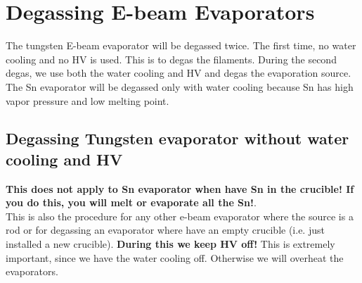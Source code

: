 \section{Degassing E-beam Evaporators}
The tungsten E-beam evaporator will be degassed twice. The first time, no water cooling and no HV is used. This is to degas the filaments. During the second degas, we use both the water cooling and HV and degas the evaporation source. The Sn evaporator will be degassed only with water cooling because Sn has high vapor pressure and low melting point.
\subsection{Degassing Tungsten evaporator without water cooling and HV}
\textbf{This does not apply to Sn evaporator when have Sn in the crucible! If you do this, you will melt or evaporate all the Sn!}.\\
This is also the procedure for any other e-beam evaporator where the source is a rod or for degassing an evaporator where have an empty crucible (i.e. just installed a new crucible). \textbf{During this we keep HV off!} This is extremely important, since we have the water cooling off. Otherwise we will overheat the evaporators.
